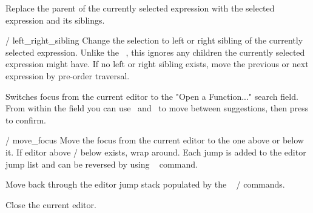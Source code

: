 Replace the parent of the currently selected expression with the selected
expression and its siblings. 

	{ / }{left_right_sibling}
Change the selection to left or right sibling of the currently selected
expression. Unlike the \ak{^}~, this ignores any children the
currently selected expression might have. If no left or right sibling
exists, move the previous or next expression by pre-order traversal.

Switches focus from the current editor to the "Open a Function..." search
field. From within the field you can use~\ak{^} and~ to move between
suggestions, then press \keys{\return} to confirm.

	{ / }{move_focus}
Move the focus from the current editor to the one above or below it. If
editor above / below exists, wrap around. Each jump is added to the
editor jump list and can be reversed by using
\hyperref[cmd:jump_back]{}~ command.

Move back through the editor jump stack populated by the
\hyperref[cmd:move_focus]{}~
 /  commands.

Close the current editor.

